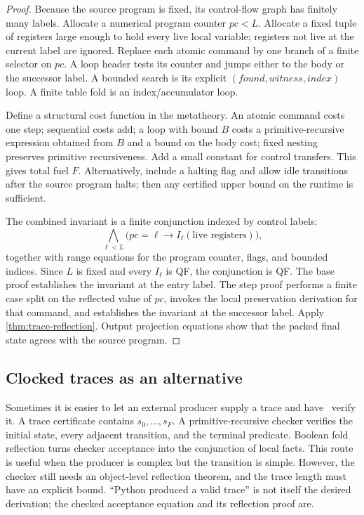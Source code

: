 \begin{proof}
Because the source program is fixed, its control-flow graph has finitely many labels.  Allocate a numerical program counter \(pc<L\).  Allocate a fixed tuple of registers large enough to hold every live local variable; registers not live at the current label are ignored.  Replace each atomic command by one branch of a finite selector on \(pc\).  A loop header tests its counter and jumps either to the body or the successor label.  A bounded search is its explicit \((found,witness,index)\) loop.  A finite table fold is an index/accumulator loop.

Define a structural cost function in the metatheory.  An atomic command costs one step; sequential costs add; a loop with bound \(B\) costs a primitive-recursive expression obtained from \(B\) and a bound on the body cost; fixed nesting preserves primitive recursiveness.  Add a small constant for control transfers.  This gives total fuel \(F\).  Alternatively, include a halting flag and allow idle transitions after the source program halts; then any certified upper bound on the runtime is sufficient.

The combined invariant is a finite conjunction indexed by control labels:
\[
  \bigwedge_{\ell<L}\bigl(pc=\ell\to I_\ell(\text{live registers})\bigr),
\]
together with range equations for the program counter, flags, and bounded indices.  Since \(L\) is fixed and every \(I_\ell\) is QF, the conjunction is QF.  The base proof establishes the invariant at the entry label.  The step proof performs a finite case split on the reflected value of \(pc\), invokes the local preservation derivation for that command, and establishes the invariant at the successor label.  Apply \cref{thm:trace-reflection}.  Output projection equations show that the packed final state agrees with the source program.
\end{proof}
\subsection{Clocked traces as an alternative}
Sometimes it is easier to let an external producer supply a trace and have \iPRA\ verify it.  A trace certificate contains \(s_0,\ldots,s_F\).  A primitive-recursive checker verifies the initial state, every adjacent transition, and the terminal predicate.  Boolean fold reflection turns checker acceptance into the conjunction of local facts.
This route is useful when the producer is complex but the transition is simple.  However, the checker still needs an object-level reflection theorem, and the trace length must have an explicit bound.  ``Python produced a valid trace'' is not itself the desired derivation; the checked acceptance equation and its reflection proof are.
